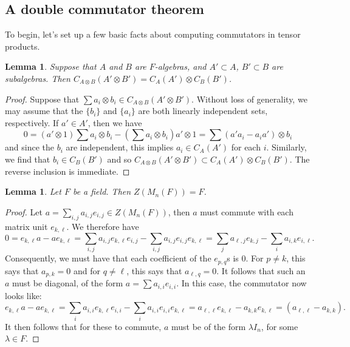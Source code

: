 \documentclass[12pt]{report}
\theoremstyle{plain}
\newtheorem{lem}[thm]{Lemma}
\begin{document}
\subsection{A double commutator theorem}

To begin, let's set up a few basic facts about computing commutators in
tensor products.

\begin{lem} \label{tensor commutators}
Suppose that $A$ and $B$ are $F$-algebras, and $A' \subset A$, $B' \subset
B$ are subalgebras. Then $C_{A \otimes B}(A' \otimes B') = C_A(A') \otimes
C_B(B')$.
\end{lem}
\begin{proof}
Suppose that $\sum a_i \otimes b_i \in C_{A \otimes B}(A' \otimes B')$.
Without loss of generality, we may assume that the $\{b_i\}$ and $\{a_i\}$ are
both linearly independent sets, respectively. If
$a' \in A'$, then we have
\[ 0 = (a' \otimes 1) \sum a_i \otimes b_i - \left(\sum a_i \otimes
b_i\right) a' \otimes 1 = \sum (a'a_i - a_i a') \otimes b_i \]
and since the $b_i$ are independent, this implies $a_i \in C_A(A')$ for
each $i$.
Similarly, we find that $b_i \in C_B(B')$ and so $C_{A \otimes B}(A'
\otimes B') \subset C_A(A') \otimes C_B(B')$. The reverse inclusion is
immediate.
\end{proof}

\begin{lem}
Let $F$ be a field. Then $Z(M_n(F)) = F$.
\end{lem}
\begin{proof}
Let $a = \sum_{i,j} a_{i,j} e_{i,j} \in Z(M_n(F))$,
then $a$ must commute with each matrix unit $e_{k,\ell}$. 
We therefore have 
\[0 = e_{k,\ell} a - a e_{k, \ell} = \sum_{i,j} a_{i,j} e_{k, \ell} e_{i,j} -
\sum_{i,j} a_{i,j} e_{i,j} e_{k,\ell} = \sum_j a_{\ell, j} e_{k, j} -
\sum_i a_{i, k} e_{i,\ell}.\]
Consequently, we must have that each coefficient of the $e_{p, q}$s is $0$.
For $p \neq k$, this says that $a_{p, k} = 0$ and for $q \neq \ell$, this
says that $a_{\ell, q} = 0$.  It follows that such an $a$ must be diagonal,
of the form $a = \sum a_{i,i} e_{i,i}$. In this case, the commutator now
looks like:
\[e_{k,\ell} a - a e_{k, \ell} = \sum_{i} a_{i,i} e_{k, \ell} e_{i,i} -
\sum_{i} a_{i,i} e_{i,i} e_{k,\ell} = a_{\ell, \ell} e_{k, \ell} - a_{k, k}
e_{k, \ell} = (a_{\ell, \ell} - a_{k,k}).\]
It then follows that for these to commute, $a$ must be of the form $\lambda
I_n$, for some $\lambda \in F$. 
\end{proof}
\end{document}
